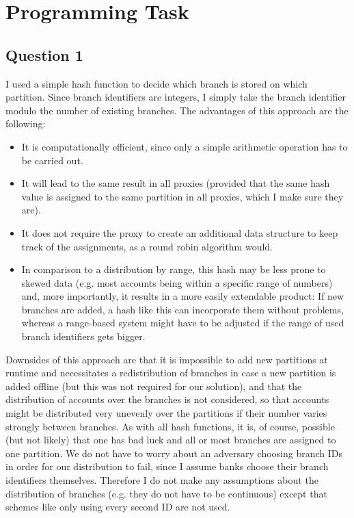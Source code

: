 \documentclass[12pt,a4paper,fleqn]{article}
\begin{document}
\section*{Programming Task} 
\label{sec:programming}

\subsection*{Question 1}
\label{sec:pq1}

I used a simple hash function to decide which branch is stored on which partition. Since branch identifiers are integers, I simply take the branch identifier modulo the number of existing branches. The advantages of this approach are the following:
\begin{itemize}
  \item It is computationally efficient, since only a simple arithmetic operation has to be carried out.
  \item It will lead to the same result in all proxies (provided that the same hash value is assigned to the same partition in all proxies, which I make sure they are).
  \item It does not require the proxy to create an additional data structure to keep track of the assignments, as a round robin algorithm would.
  \item In comparison to a distribution by range, this hash may be less prone to skewed data (e.g. most accounts being within a specific range of numbers) and, more importantly, it results in a more easily extendable product: If new branches are added, a hash like this can incorporate them without problems, whereas a range-based system might have to be adjusted if the range of used branch identifiers gets bigger.
\end{itemize}
Downsides of this approach are that it is impossible to add new partitions at runtime and necessitates a redistribution of branches in case a new partition is added offline (but this was not required for our solution), and that the distribution of accounts over the branches is not considered, so that accounts might be distributed very unevenly over the partitions if their number varies strongly between branches. As with all hash functions, it is, of course, possible (but not likely) that one has bad luck and all or most branches are assigned to one partition. We do not have to worry about an adversary choosing branch IDs in order for our distribution to fail, since I assume banks choose their branch identifiers themselves.
Therefore I do not make any assumptions about the distribution of branches (e.g. they do not have to be continuous) except that schemes like only using every second ID are not used.
\end{document}

